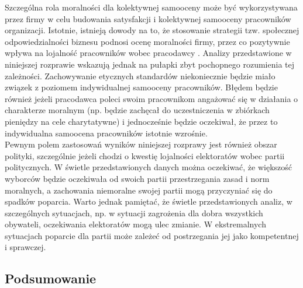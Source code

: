 \documentclass[man]{apa6}
\begin{document}
Szczególna rola moralności dla kolektywnej samooceny może być wykorzystywana przez firmy w celu budowania satysfakcji i kolektywnej samooceny pracowników organizacji. Istotnie, istnieją dowody na to, że stosowanie strategii tzw. społecznej odpowiedzialności biznesu podnosi ocenę moralności firmy, przez co pozytywnie wpływa na lojalność pracowników wobec pracodawcy \parencite{bauman2012corporate, ellemers2011corporate}. Analizy przedstawione w niniejszej rozprawie wskazują jednak na pułapki zbyt pochopnego rozumienia tej zależności. Zachowywanie etycznych standardów niekoniecznie będzie miało związek z poziomem indywidualnej samooceny pracowników. Błędem będzie również jeżeli pracodawca poleci swoim pracownikom angażować się w działania o charakterze moralnym (np. będzie zachęcał do uczestniczenia w zbiórkach pieniędzy na cele charytatywne) i jednocześnie będzie oczekiwał, że przez to indywidualna samoocena pracowników istotnie wzrośnie.\\

Pewnym polem zastosowań wyników niniejszej rozprawy jest również obszar polityki, szczególnie jeżeli chodzi o kwestię  lojalności elektoratów wobec partii politycznych. W świetle przedstawionych danych można oczekiwać, że większość wyborców będzie oczekiwała od swoich partii przestrzegania zasad i norm moralnych, a zachowania niemoralne swojej partii mogą przyczyniać się do spadków poparcia. Warto jednak pamiętać, że świetle przedstawionych analiz, w szczególnych sytuacjach, np. w sytuacji zagrożenia dla dobra wszystkich obywateli, oczekiwania elektoratów mogą ulec zmianie. W ekstremalnych sytuacjach poparcie dla partii może zależeć od postrzegania jej jako kompetentnej i sprawczej.\\

\subsection{Podsumowanie}




\printbibliography
\end{document}
